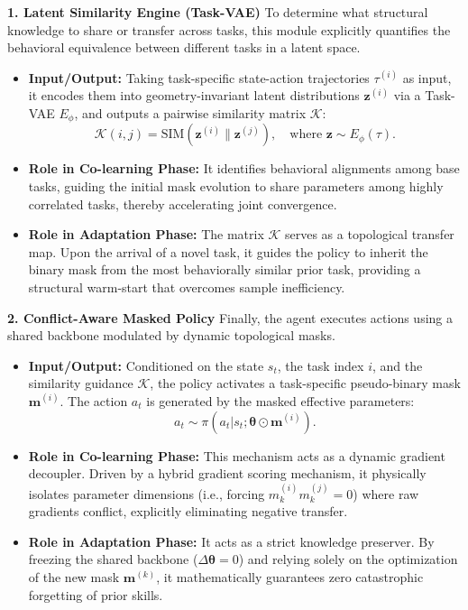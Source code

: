 \documentclass{article}
\begin{document}
\textbf{1. Latent Similarity Engine (Task-VAE)}
To determine what structural knowledge to share or transfer across tasks, this module explicitly quantifies the behavioral equivalence between different tasks in a latent space.
\begin{itemize}
\item \textbf{Input/Output:} Taking task-specific state-action trajectories $\tau^{(i)}$ as input, it encodes them into geometry-invariant latent distributions $\bm{z}^{(i)}$ via a Task-VAE $E_\phi$, and outputs a pairwise similarity matrix $\mathcal{K}$:
\begin{equation}
\mathcal{K}(i,j) = \text{SIM}(\bm{z}^{(i)} \| \bm{z}^{(j)}), \quad \text{where } \bm{z} \sim E_{\phi}(\tau).
\label{eq:similarity}
\end{equation}
\item \textbf{Role in Co-learning Phase:} It identifies behavioral alignments among base tasks, guiding the initial mask evolution to share parameters among highly correlated tasks, thereby accelerating joint convergence.
\item \textbf{Role in Adaptation Phase:} The matrix $\mathcal{K}$ serves as a topological transfer map. Upon the arrival of a novel task, it guides the policy to inherit the binary mask from the most behaviorally similar prior task, providing a structural warm-start that overcomes sample inefficiency.
\end{itemize}

\textbf{2. Conflict-Aware Masked Policy}
Finally, the agent executes actions using a shared backbone modulated by dynamic topological masks.
\begin{itemize}
\item \textbf{Input/Output:} Conditioned on the state $s_t$, the task index $i$, and the similarity guidance $\mathcal{K}$, the policy activates a task-specific pseudo-binary mask $\bm{m}^{(i)}$. The action $a_t$ is generated by the masked effective parameters:
\begin{equation}
a_t \sim \pi(a_t | s_t; \bm{\theta} \odot \bm{m}^{(i)}).
\label{eq:policy_execution}
\end{equation}
\item \textbf{Role in Co-learning Phase:} This mechanism acts as a dynamic gradient decoupler. Driven by a hybrid gradient scoring mechanism, it physically isolates parameter dimensions (i.e., forcing $m_k^{(i)} m_k^{(j)} = 0$) where raw gradients conflict, explicitly eliminating negative transfer.
\item \textbf{Role in Adaptation Phase:} It acts as a strict knowledge preserver. By freezing the shared backbone ($\Delta \bm{\theta} = 0$) and relying solely on the optimization of the new mask $\bm{m}^{(k)}$, it mathematically guarantees zero catastrophic forgetting of prior skills.
\end{itemize}
\end{document}
